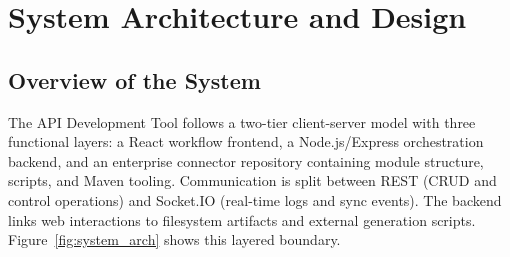 \chapter{System Architecture and Design}

\section{Overview of the System}

The API Development Tool follows a two-tier client-server model with three functional layers: a React workflow frontend, a Node.js/Express orchestration backend, and an enterprise connector repository containing module structure, scripts, and Maven tooling. Communication is split between REST (CRUD and control operations) and Socket.IO (real-time logs and sync events). The backend links web interactions to filesystem artifacts and external generation scripts. Figure~\ref{fig:system_arch} shows this layered boundary.

